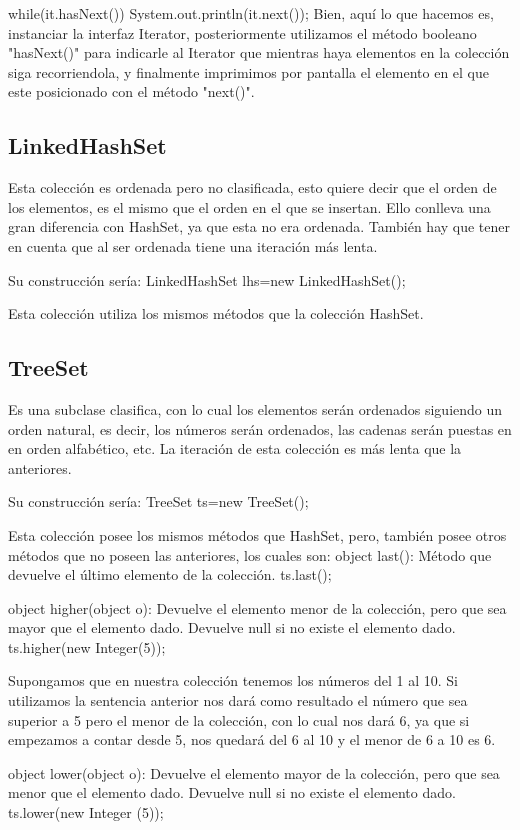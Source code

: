 \documentclass[12pt,a4paper]{report}
\begin{document}
{while(it.hasNext()){
System.out.println(it.next());
}
Bien, aquí lo que hacemos es, instanciar la interfaz Iterator, posteriormente utilizamos el método booleano "hasNext()" para indicarle al Iterator que mientras haya elementos en la colección siga recorriendola, y finalmente imprimimos por pantalla el elemento en el que este posicionado con el método "next()".

\subsection*{LinkedHashSet}
Esta colección es ordenada pero no clasificada, esto quiere decir que el orden de los elementos, es el mismo que el orden en el que se insertan. Ello conlleva una gran diferencia con HashSet, ya que esta no era ordenada. También hay que tener en cuenta que al ser ordenada tiene una iteración más lenta.

Su construcción sería:
LinkedHashSet lhs=new LinkedHashSet();

Esta colección utiliza los mismos métodos que la colección HashSet.

\subsection*{TreeSet}
Es una subclase clasifica, con lo cual los elementos serán ordenados siguiendo un orden natural, es decir, los números serán ordenados, las cadenas serán puestas en en orden alfabético, etc. La iteración de esta colección es más lenta que la anteriores.

Su construcción sería:
TreeSet ts=new TreeSet();

Esta colección posee los mismos métodos que HashSet, pero, también posee otros métodos que no poseen las anteriores, los cuales son:
object last(): Método que devuelve el último elemento de la colección.
		ts.last();

object higher(object o): Devuelve el elemento menor de la colección, pero que sea mayor que el elemento dado. Devuelve null si no existe el elemento dado.
ts.higher(new Integer(5));

Supongamos que en nuestra colección tenemos los números del 1 al 10. Si utilizamos la sentencia anterior nos dará como resultado el número que sea superior a 5 pero el menor de la colección, con lo cual nos dará 6, ya que si empezamos a contar desde 5, nos quedará del 6 al 10 y el menor de 6 a 10 es 6.

object lower(object o): Devuelve el elemento mayor de la colección, pero que sea menor que el elemento dado. Devuelve null si no existe el elemento dado.
ts.lower(new Integer (5));

}
\end{document}

